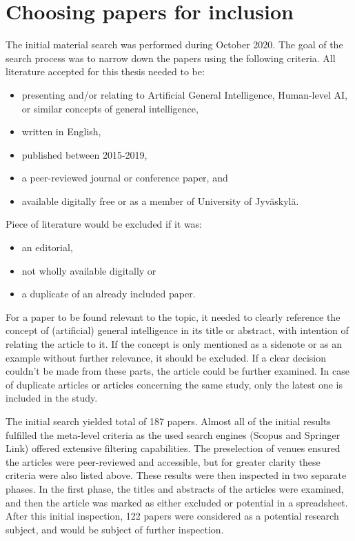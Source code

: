 \section{Choosing papers for inclusion}

The initial material search was performed during October 2020. The goal of the
search process was to narrow down the papers using the following criteria. All
literature accepted for this thesis needed to be:

\begin{itemize}
  \item presenting and/or relating to Artificial General Intelligence,
        Human-level AI, or similar concepts of general intelligence,
  \item written in English,
  \item published between 2015-2019,
  \item a peer-reviewed journal or conference paper, and
  \item available digitally free or as a member of University of Jyväskylä.
\end{itemize}

Piece of literature would be excluded if it was:

\begin{itemize}
  \item an editorial,
  \item not wholly available digitally or
  \item a duplicate of an already included paper.
\end{itemize}

For a paper to be found relevant to the topic, it needed to clearly reference
the concept of (artificial) general intelligence in its title or abstract, with
intention of relating the article to it. If the concept is only mentioned as a
sidenote or as an example without further relevance, it should be excluded. If a
clear decision couldn't be made from these parts, the article could be further
examined. In case of duplicate articles or articles concerning the same study,
only the latest one is included in the study.

The initial search yielded total of 187 papers. Almost all of the initial
results fulfilled the meta-level criteria as the used search engines (Scopus and
Springer Link) offered extensive filtering capabilities. The preselection of
venues ensured the articles were peer-reviewed and accessible, but for greater
clarity these criteria were also listed above. These results were then inspected
in two separate phases. In the first phase, the titles and abstracts of the
articles were examined, and then the article was marked as either excluded or
potential in a spreadsheet. After this initial inspection, 122 papers were
considered as a potential research subject, and would be subject of further
inspection.

